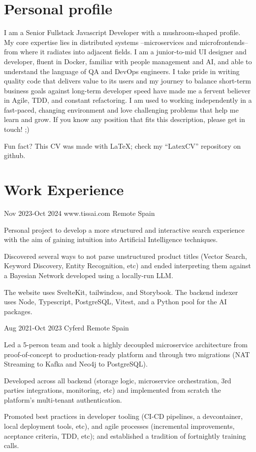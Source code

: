 \documentclass[10pt]{CurriculumVitae}
\begin{document}
  \makeheading

  \section{Personal profile}
    {
      I am a Senior Fullstack Javascript Developer with a mushroom-shaped profile.
      My core expertise lies in distributed systems –microservices and microfrontends– from where it radiates into adjacent fields. I am a junior-to-mid UI designer and developer, fluent in Docker, familiar with people management and AI, and able to understand the language of QA and DevOps engineers.
      I take pride in writing quality code that delivers value to its users and my journey to balance short-term business goals against long-term developer speed have made me a fervent believer in Agile, TDD, and constant refactoring.
      I am used to working independently in a fast-paced, changing environment and love challenging problems that help me learn and grow.
      If you know any position that fits this description, please get in touch! ;) 
      
      \null\hfill {\scriptsize Fun fact? This CV was made with LaTeX; check my ``LatexCV'' repository on github.}
    }


  \section{Work Experience}

      {Nov 2023-Oct 2024}
      {www.tissai.com}
      {Remote}
      {Spain}
      {
        \item Personal project to develop a more structured and interactive search experience with the aim of gaining intuition into Artificial Intelligence techniques.
        \item Discovered several ways to not parse unstructured product titles (Vector Search, Keyword Discovery, Entity Recognition, etc) and ended interpreting them against a Bayesian Network developed using a locally-run LLM.
        \item The website uses SvelteKit, tailwindcss, and Storybook. The backend indexer uses Node, Typescript, PostgreSQL, Vitest, and a Python pool for the AI packages.
      }

      {Aug 2021-Oct 2023}
      {Cyferd}
      {Remote}
      {Spain}
      {
        \item Led a 5-person team and took a highly decoupled microservice architecture from proof-of-concept to production-ready platform and through two migrations (NAT Streaming to Kafka and Neo4j to PostgreSQL).
        \item Developed across all backend (storage logic, microservice orchestration, 3rd parties integrations, monitoring, etc) and implemented from scratch the platform's multi-tenant authentication.
        \item Promoted best practices in developer tooling (CI-CD pipelines, a devcontainer, local deployment tools, etc), and agile processes (incremental improvements, aceptance criteria, TDD, etc); and established a tradition of fortnightly training calls.
      }
\end{document}
